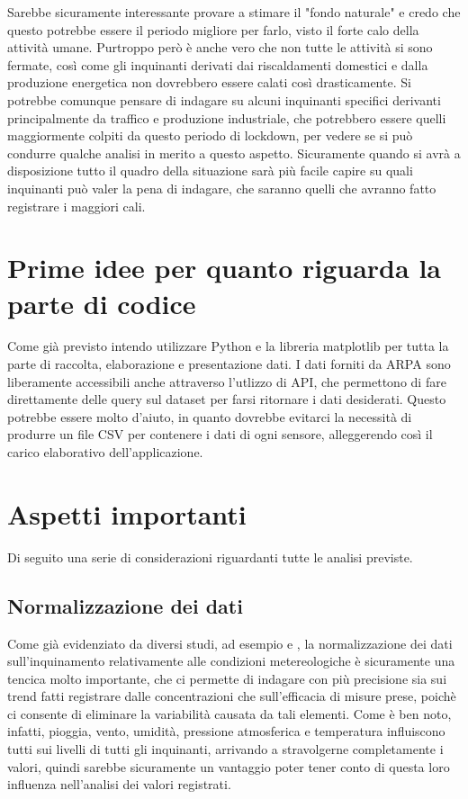 \documentclass{article}
\begin{document}
Sarebbe sicuramente interessante provare a stimare il "fondo naturale" e credo che questo potrebbe essere il periodo migliore per farlo, visto il forte calo della attività umane. Purtroppo però è anche vero che non tutte le attività si sono fermate, così come gli inquinanti derivati dai riscaldamenti domestici e dalla produzione energetica non dovrebbero essere calati così drasticamente. Si potrebbe comunque pensare di indagare su alcuni inquinanti specifici derivanti principalmente da traffico e produzione industriale, che potrebbero essere quelli maggiormente colpiti da questo periodo di lockdown, per vedere se si può condurre qualche analisi in merito a questo aspetto. Sicuramente quando si avrà a disposizione tutto il quadro della situazione sarà più facile capire su quali inquinanti può valer la pena di indagare, che saranno quelli che avranno fatto registrare i maggiori cali.


\section{Prime idee per quanto riguarda la parte di codice}
Come già previsto intendo utilizzare Python e la libreria matplotlib per tutta la parte di raccolta, elaborazione e presentazione dati. I dati forniti da ARPA sono liberamente accessibili anche attraverso l'utlizzo di API, che permettono di fare direttamente delle query sul dataset per farsi ritornare i dati desiderati. Questo potrebbe essere molto d'aiuto, in quanto dovrebbe evitarci la necessità di produrre un file CSV per contenere i dati di ogni sensore, alleggerendo così il carico elaborativo dell'applicazione.


\section{Aspetti importanti}
Di seguito una serie di considerazioni riguardanti tutte le analisi previste.
\subsection{Normalizzazione dei dati}
Come già evidenziato da diversi studi, ad esempio \cite{hoogerbrugge2010trends} e \cite{grange2019using}, la normalizzazione dei dati sull'inquinamento relativamente alle condizioni metereologiche è sicuramente una tencica molto importante, che ci permette di indagare con più precisione sia sui trend fatti registrare dalle concentrazioni che sull'efficacia di misure prese, poichè ci consente di eliminare la variabilità causata da tali elementi. Come è ben noto, infatti, pioggia, vento, umidità, pressione atmosferica e temperatura influiscono tutti sui livelli di tutti gli inquinanti, arrivando a stravolgerne completamente i valori, quindi sarebbe sicuramente un vantaggio poter tener conto di questa loro influenza nell'analisi dei valori registrati.
\end{document}
